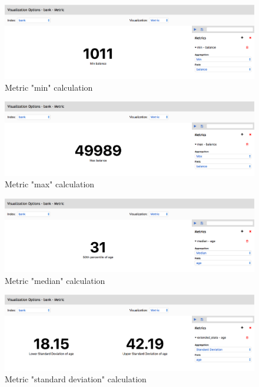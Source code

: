 \documentclass[a4paper, 12pt, english]{book}
\begin{document}
\begin{figure}
  \centering
  \includegraphics[width=13cm, keepaspectratio]{img/metric-min-calculation.png}
  \caption{Metric "min" calculation}
  \label{fig:metric-min-calcuation}
\end{figure}

\begin{figure}
  \centering
  \includegraphics[width=13cm, keepaspectratio]{img/metric-max-calculation.png}
  \caption{Metric "max" calculation}
  \label{fig:metric-max-calcuation}
\end{figure}

\begin{figure}
  \centering
  \includegraphics[width=13cm, keepaspectratio]{img/metric-median-calculation.png}
  \caption{Metric "median" calculation}
  \label{fig:metric-median-calcuation}
\end{figure}

\begin{figure}
  \centering
  \includegraphics[width=13cm, keepaspectratio]{img/metric-std-calculation.png}
  \caption{Metric "standard deviation" calculation}
  \label{fig:metric-std-calcuation}
\end{figure}
\end{document}
